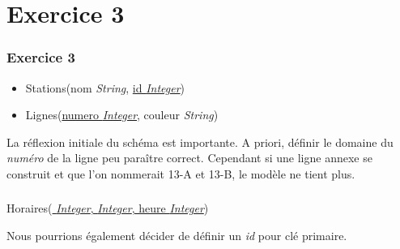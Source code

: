 \documentclass[svgnames,11pt]{beamer}
\begin{document}
\section{Exercice 3}
\begin{frame}
    \frametitle{Exercice 3}

    \begin{itemize}
        \item Stations(nom \emph{String}, \underline{id \emph{Integer}})
        \item Lignes(\underline{numero \emph{Integer}}, couleur \emph{String})
    \end{itemize}
    
    \vspace{1cm}
    La réflexion initiale du schéma est importante. A priori, définir le domaine du \emph{numéro} de la ligne peu paraître correct. Cependant si une ligne annexe se construit et que l'on nommerait 13-A et 13-B, le modèle ne tient plus.    

\end{frame}
\begin{frame}
    \frametitle{}

    Horaires(\underline{ \emph{Integer},  \emph{Integer}, heure \emph{Integer}})

    \vspace{1cm}
    Nous pourrions également décider de définir un \emph{id} pour clé primaire.   

\end{frame}
\end{document}
